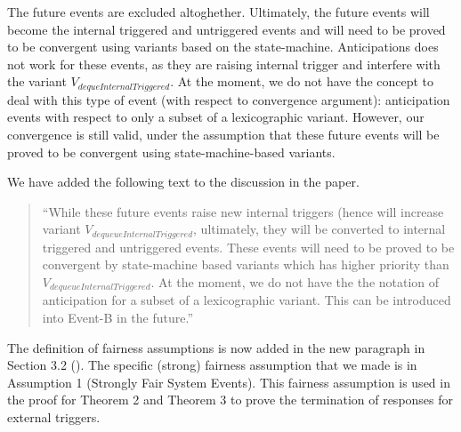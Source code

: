 \documentclass{response}
\begin{document}
\begin{response}
  The future events are excluded altoghether. Ultimately, the future
  events will become the internal triggered and untriggered events and
  will need to be proved to be convergent using variants based on the
  state-machine. Anticipations does not work for these events, as they
  are raising internal trigger and interfere with the variant
  $V_{dequeInternalTriggered}$. At the moment, we do not have the
  concept to deal with this type of event (with respect to convergence
  argument): anticipation events with respect to only a subset of a
  lexicographic variant. However, our convergence is still valid, under the
  assumption that these future events will be proved to be convergent
  using state-machine-based variants.

  We have added the following text to the discussion in the paper.
  \begin{quote}
    ``While these future events raise new internal
  triggers (hence will increase variant
  $V_{dequeueInternalTriggered}$, ultimately, they will be converted
to internal triggered and untriggered events.  These events will need
to be proved to be convergent by state-machine based variants which
has higher priority than $V_{dequeueInternalTriggered}$.  At the
moment, we do not have the the notation of anticipation for a subset
of a lexicographic variant. This can be introduced into Event-B in the
future.''
  \end{quote}
\end{response}

\begin{comment}{Reviewer \#1}
• p.25 could you state explicitly your strong fairness property and the
interplay with the temporal properties you are concerned with.
\end{comment}

\begin{response}
  The definition of fairness assumptions is now added in the new
  paragraph in Section 3.2 (\EventB).  The specific (strong) fairness
  assumption that we made is in Assumption 1 (Strongly Fair System
  Events). This fairness assumption is used in the proof for Theorem 2
  and Theorem 3 to prove the termination of responses for external
  triggers.
\end{response}


\begin{comment}{Reviewer \#1}
• p.25 A reference to the seminal Unless of Unity could be in order.
\end{comment}
\end{document}
